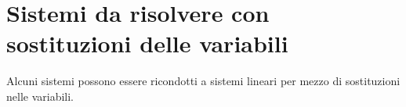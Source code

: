 % 
% 
% 
% 

\section{Sistemi da risolvere con sostituzioni delle variabili}
\label{sec:compl1_sistemisotituzionevariabili}

Alcuni sistemi possono essere ricondotti a sistemi lineari per mezzo di
sostituzioni nelle variabili.

